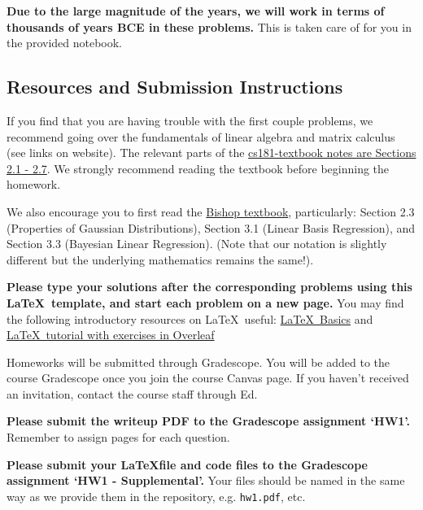 \documentclass[submit]{../harvardml}
\begin{document}
\textbf{Due to the large magnitude of the years, we will work in terms
  of thousands of years BCE in these problems.} This is taken care of
for you in the provided notebook.






\subsection*{Resources and Submission Instructions}
If you find that you are having trouble with the first couple
problems, we recommend going over the fundamentals of linear algebra
and matrix calculus (see links on website).  The relevant parts of the
\href{https://github.com/harvard-ml-courses/cs181-textbook/blob/master/Textbook.pdf}{cs181-textbook
  notes are Sections 2.1 - 2.7}.  We strongly recommend reading the
textbook before beginning the homework.

We also encourage you to first read the
\href{http://users.isr.ist.utl.pt/~wurmd/Livros/school/Bishop\%20-\%20Pattern\%20Recognition\%20And\%20Machine\%20Learning\%20-\%20Springer\%20\%202006.pdf}{Bishop
  textbook}, particularly: Section 2.3 (Properties of Gaussian
Distributions), Section 3.1 (Linear Basis Regression), and Section 3.3
(Bayesian Linear Regression). (Note that our notation is slightly
different but the underlying mathematics remains the same!).

\textbf{Please type your solutions after the corresponding problems
  using this \LaTeX\ template, and start each problem on a new page.}
You may find the following introductory resources on \LaTeX\ useful:
\href{http://www.mjdenny.com/workshops/LaTeX_Intro.pdf}{\LaTeX\ Basics}
and
\href{https://www.overleaf.com/learn/latex/Free_online_introduction_to_LaTeX_(part_1)}{\LaTeX\ tutorial
  with exercises in Overleaf}

Homeworks will be submitted through Gradescope. You will be added to
the course Gradescope once you join the course Canvas page. If you
haven't received an invitation, contact the course staff through Ed.

\textbf{Please submit the writeup PDF to the Gradescope assignment
  `HW1'.} Remember to assign pages for each question.

\textbf{Please submit your \LaTeX file and code files to the
  Gradescope assignment `HW1 - Supplemental'.} Your files should be
named in the same way as we provide them in the repository,
e.g. \texttt{hw1.pdf}, etc.
\end{document}
